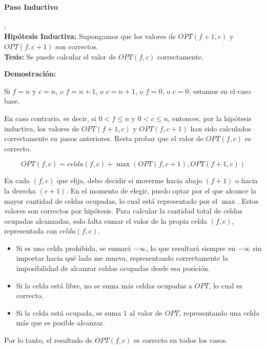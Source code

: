 \paragraph{Paso Inductivo}: \\
\textbf{Hipótesis Inductiva:} Supongamos que los valores de $OPT(f+1,c)$ y $OPT(f,c+1)$ son correctos.\\
\textbf{Tesis:} Se puede calcular el valor de $OPT(f,c)$ correctamente.

\textbf{Demostración:} 

Si $f = n$ y $c = n$, o $f = n+1$, o $c = n+1$, o $f = 0$, o $c = 0$, estamos en el caso base.

En caso contrario, es decir, si $0 < f \leq n$ y $0 < c \leq n$, entonces, por la hipótesis inductiva, los valores de $OPT(f+1, c)$ y $OPT(f, c+1)$ han sido calculados correctamente en pasos anteriores. Resta probar que el valor de $OPT(f, c)$ es correcto.

\[
OPT(f, c) = celda(f, c) + \max\left(OPT(f, c+1), OPT(f+1, c)\right) 
\]

En cada $(f,c)$ que elija, debo decidir si moverme hacia abajo $(f+1)$ o hacia la derecha $(c+1)$. En el momento de elegir, puedo optar por el que alcance la mayor cantidad de celdas ocupadas, lo cual está representado por el $\max$. Estos valores son correctos por hipótesis. Para calcular la cantidad total de celdas ocupadas alcanzadas, solo falta sumar el valor de la propia celda $(f,c)$, representada con $celda(f,c)$.

\begin{itemize}
    \item Si es una celda prohibida, se sumará $-\infty$, lo que resultará siempre en $-\infty$ sin importar hacia qué lado me mueva, representando correctamente la imposibilidad de alcanzar celdas ocupadas desde esa posición.
    \item Si la celda está libre, no se suma más celdas ocupadas a $OPT$, lo cual es correcto.
    \item Si la celda está ocupada, se suma $1$ al valor de $OPT$, representando una celda más que es posible alcanzar.
\end{itemize}

Por lo tanto, el resultado de $OPT(f,c)$ es correcto en todos los casos.

\newpage
